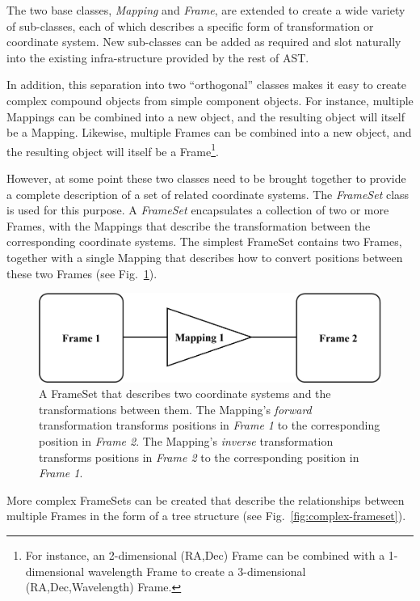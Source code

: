 \documentclass[final,authoryear,5p,times,twocolumn]{elsarticle}
\begin{document}
The two base classes, \emph{Mapping} and \emph{Frame}, are extended
to create a wide variety of sub-classes, each of which describes a
specific form of transformation or coordinate system. New sub-classes can
be added as required and slot naturally into the existing
infra-structure provided by the rest of AST.

In addition, this separation into two ``orthogonal'' classes makes it
easy to create complex compound objects from simple component objects.
For instance, multiple Mappings can be combined into a new object, and
the resulting object will itself be a Mapping. Likewise, multiple Frames
can be combined into a new object, and the resulting object will itself be
a Frame\footnote{For instance, an 2-dimensional (RA,Dec) Frame can be
combined with a 1-dimensional wavelength Frame to create a 3-dimensional
(RA,Dec,Wavelength) Frame.}.

However, at some point these two classes need to be brought together to
provide a complete description of a set of related coordinate systems.
The \emph{FrameSet} class is used for this purpose. A \emph{FrameSet}
encapsulates a collection of two or more Frames, with the Mappings that
describe the transformation between the corresponding coordinate systems.
The simplest FrameSet contains two Frames, together with a single Mapping that
describes how to convert positions between these two Frames (see
Fig.~\ref{fig:simple-frameset}).

\begin{figure}[h]
\centering
\includegraphics[width=0.5\columnwidth]{simple-frameset}
\caption{A FrameSet that describes two coordinate systems and the
transformations between them. The Mapping's \emph{forward} transformation
transforms positions in \emph{Frame 1} to the corresponding position in
\emph{Frame 2}. The Mapping's \emph{inverse} transformation
transforms positions in \emph{Frame 2} to the corresponding position in
\emph{Frame 1}. }
\label{fig:simple-frameset}
\end{figure}

More complex FrameSets can be created that describe the relationships between
multiple Frames in the form of a tree structure (see
Fig.~\ref{fig:complex-frameset}).
\end{document}
